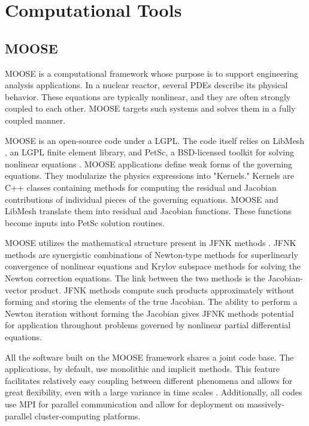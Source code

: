 \documentclass[11pt,letterpaper]{article}
\begin{document}
\section{Computational Tools}

\subsection{MOOSE}

\gls{MOOSE}\cite{gaston_moose_2009} is a computational framework whose purpose is to support engineering analysis applications.
In a nuclear reactor, several \glspl{PDE} describe its physical behavior.
These equations are typically nonlinear, and they are often strongly coupled to each other.
\gls{MOOSE} targets such systems and solves them in a fully coupled manner.

\gls{MOOSE} is an open-source code under a \gls{LGPL}.
The code itself relies on LibMesh \cite{kirk_libmesh_2006}, an LGPL finite element library, and PetSc, a \gls{BSD}-licensed toolkit for solving nonlinear equations \cite{balay_petsc_2016}.
MOOSE applications define weak forms of the governing equations.
They modularize the physics expressions into "Kernels."
Kernels are C++ classes containing methods for computing the residual and Jacobian contributions of individual pieces of the governing equations.
\gls{MOOSE} and LibMesh translate them into residual and Jacobian functions.
These functions become inputs into PetSc solution routines.

\gls{MOOSE} utilizes the mathematical structure present in \gls{JFNK} methods \cite{knoll_jacobian-free_2004}.
\gls{JFNK} methods are synergistic combinations of Newton-type methods for superlinearly convergence of nonlinear equations and Krylov subspace methods for solving the Newton correction equations.
The link between the two methods is the Jacobian-vector product.
\gls{JFNK} methods compute such products approximately without forming and storing the elements of the true Jacobian.
The ability to perform a Newton iteration without forming the Jacobian gives \gls{JFNK} methods potential for application throughout problems governed by nonlinear partial differential equations.

All the software built on the \gls{MOOSE} framework shares a joint code base.
The applications, by default, use monolithic and implicit methods.
This feature facilitates relatively easy coupling between different phenomena and allows for great flexibility, even with a large variance in time scales \cite{novak_pronghorn_2018}.
Additionally, all codes use MPI for parallel communication and allow for deployment on massively-parallel cluster-computing platforms.
\end{document}
